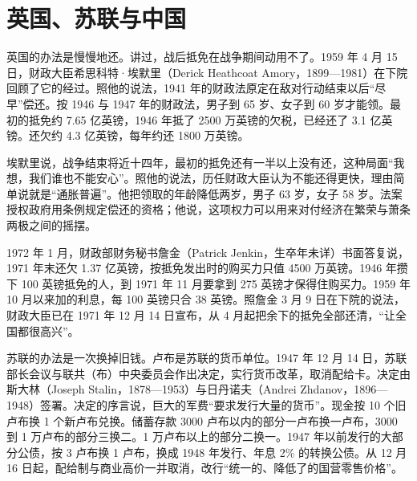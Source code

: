 \section{英国、苏联与中国}\label{sec:reconstruction-others}

英国的办法是慢慢地还。讲过，战后抵免在战争期间动用不了。1959 年 4 月 15 日，财政大臣希思科特·埃默里（Derick Heathcoat Amory，1899—1981）在下院回顾了它的经过\cite{hansard1959,gnd35}。照他的说法，1941 年的财政法原定在敌对行动结束以后“尽早”偿还\cite{hansard1959}。按 1946 与 1947 年的财政法，男子到 65 岁、女子到 60 岁才能领\cite{hansard1959}。最初的抵免约 7.65 亿英镑，1946 年抵了 2500 万英镑的欠税，已经还了 3.1 亿英镑\cite{hansard1959}。还欠约 4.3 亿英镑，每年约还 1800 万英镑\cite{hansard1959}。

埃默里说，战争结束将近十四年，最初的抵免还有一半以上没有还，这种局面“我想，我们谁也不能安心”\cite{hansard1959}。照他的说法，历任财政大臣认为不能还得更快，理由简单说就是“通胀普遍”\cite{hansard1959}。他把领取的年龄降低两岁，男子 63 岁，女子 58 岁\cite{hansard1959}。法案授权政府用条例规定偿还的资格；他说，这项权力可以用来对付经济在繁荣与萧条两极之间的摇摆\cite{hansard1959}。

1972 年 1 月，财政部财务秘书詹金（Patrick Jenkin，生卒年未详）书面答复说，1971 年末还欠 1.37 亿英镑，按抵免发出时的购买力只值 4500 万英镑\cite{hansard1972a}。1946 年攒下 100 英镑抵免的人，到 1971 年 11 月要拿到 275 英镑才保得住购买力\cite{hansard1972a}。1959 年 10 月以来加的利息，每 100 英镑只合 38 英镑\cite{hansard1972a}。照詹金 3 月 9 日在下院的说法，财政大臣已在 1971 年 12 月 14 日宣布，从 4 月起把余下的抵免全部还清，“让全国都很高兴”\cite{hansard1972b}。

苏联的办法是一次换掉旧钱。卢布是苏联的货币单位。1947 年 12 月 14 日，苏联部长会议与联共（布）中央委员会作出决定，实行货币改革，取消配给卡\cite{ussr1947}。决定由斯大林（Joseph Stalin，1878—1953）与日丹诺夫（Andrei Zhdanov，1896—1948）签署\cite{ussr1947,loc35}。决定的序言说，巨大的军费“要求发行大量的货币”\cite{ussr1947}。现金按 10 个旧卢布换 1 个新卢布兑换\cite{ussr1947}。储蓄存款 3000 卢布以内的部分一卢布换一卢布，3000 到 1 万卢布的部分三换二\cite{ussr1947}。1 万卢布以上的部分二换一\cite{ussr1947}。1947 年以前发行的大部分公债，按 3 卢布换 1 卢布，换成 1948 年发行、年息 2\% 的转换公债\cite{ussr1947}。从 12 月 16 日起，配给制与商业高价一并取消，改行“统一的、降低了的国营零售价格”\cite{ussr1947}。

